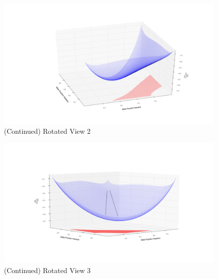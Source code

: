 \begin{figure}[hp]
\vspace{40pt}
\ContinuedFloat
\centering
\includegraphics[width = \textwidth, bb=100 100 1600 700]{Results_Parts/TernaryParams/heptane-hexane-methanol/DWPMTieline3and4/rotation6.png}
\caption[]{(Continued) Rotated View 2}
\end{figure}

\begin{figure}[hp]
\vspace{40pt}
\ContinuedFloat
\centering
\includegraphics[width = \textwidth, bb=100 100 1600 700]{Results_Parts/TernaryParams/heptane-hexane-methanol/DWPMTieline3and4/rotation8.png}
\caption[]{(Continued) Rotated View 3}
\end{figure}

\clearpage

